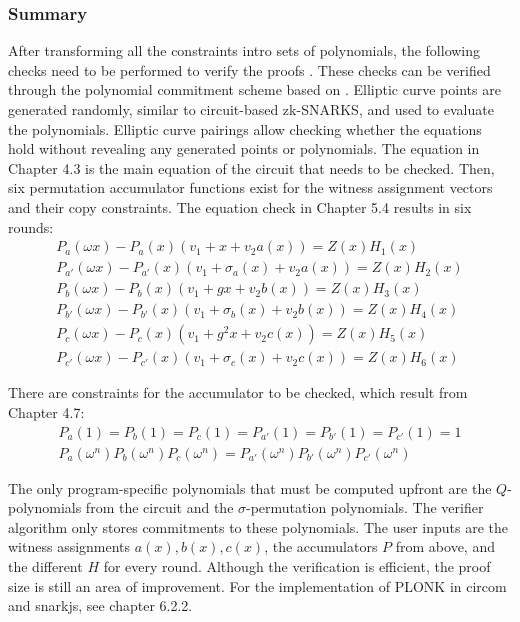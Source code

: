\subsubsection{Summary}
After transforming all the constraints intro sets of polynomials, the following checks need to be performed to verify the proofs \citep{PLONKcryptoeprint:2019/953, buterinplonk, chen2022review}. These checks can be verified through the polynomial commitment scheme based on \citep{Kate2010ConstantSizeCT}. Elliptic curve points are generated randomly, similar to circuit-based zk-SNARKS, and used to evaluate the polynomials. Elliptic curve pairings allow checking whether the equations hold without revealing any generated points or polynomials. 
The equation in Chapter 4.3 is the main equation of the circuit that needs to be checked. Then, six permutation accumulator functions exist for the witness assignment vectors and their copy constraints. The equation check in Chapter 5.4 results in six rounds:
\begin{align}
    P_{a}(\omega x) - P_{a}(x)(v_1 + x + v_2a(x)) = Z(x)H_{1}(x) \\
    P_{a'}(\omega x) - P_{a'}(x)(v_1 + \sigma_{a}(x) + v_2a(x)) = Z(x)H_{2}(x) \\
    P_{b}(\omega x) - P_{b}(x)(v_1 + gx + v_2b(x)) = Z(x)H_{3}(x) \\
    P_{b'}(\omega x) - P_{b'}(x)(v_1 + \sigma_{b}(x) + v_2b(x)) = Z(x)H_{4}(x) \\
    P_{c}(\omega x) - P_{c}(x)(v_1 + g^{2}x + v_2c(x)) = Z(x)H_{5}(x) \\
    P_{c'}(\omega x) - P_{c'}(x)(v_1 + \sigma_{c}(x) + v_2c(x)) = Z(x)H_{6}(x)
\end{align}

There are constraints for the accumulator to be checked, which result from Chapter 4.7:
\begin{align}
    P_{a}(1) = P_{b}(1) = P_{c}(1) = P_{a'}(1) = P_{b'}(1) = P_{c'}(1) = 1 \\
    P_{a}(\omega^n)P_{b}(\omega^n)P_{c}(\omega^n) = P_{a'}(\omega^n)P_{b'}(\omega^n)P_{c'}(\omega^n)
\end{align}

The only program-specific polynomials that must be computed upfront are the \(Q\)-polynomials from the circuit and the \(\sigma\)-permutation polynomials. The verifier algorithm only stores commitments to these polynomials. The user inputs are the witness assignments \(a(x), b(x), c(x)\), the accumulators \(P\) from above, and the different \(H\) for every round. Although the verification is efficient, the proof size is still an area of improvement. For the implementation of PLONK in circom and snarkjs, see chapter 6.2.2.

